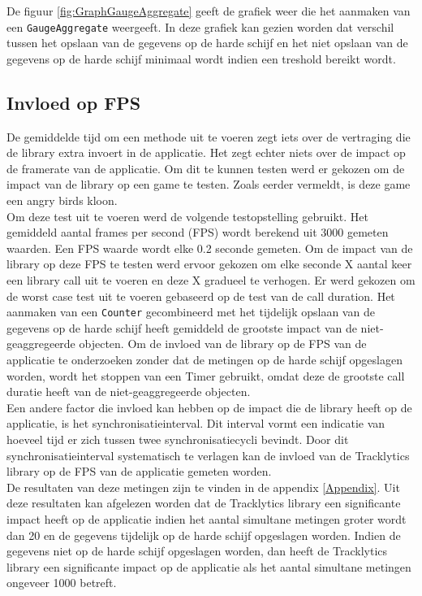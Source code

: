 De figuur \ref{fig:GraphGaugeAggregate} geeft de grafiek weer die het aanmaken van een \texttt{GaugeAggregate} weergeeft. In deze grafiek kan gezien worden dat verschil tussen het opslaan van de gegevens op de harde schijf en het niet opslaan van de gegevens op de harde schijf minimaal wordt indien een treshold bereikt wordt. \\


\subsection{Invloed op FPS}
De gemiddelde tijd om een methode uit te voeren zegt iets over de vertraging die de library extra invoert in de applicatie. Het zegt echter niets over de impact op de framerate van de applicatie. Om dit te kunnen testen werd er gekozen om de impact van de library op een game te testen. Zoals eerder vermeldt, is deze game een angry birds kloon. \\

Om deze test uit te voeren werd de volgende testopstelling gebruikt. Het gemiddeld aantal frames per second (FPS) wordt berekend uit 3000 gemeten waarden. Een FPS waarde wordt elke 0.2 seconde gemeten. Om de impact van de library op deze FPS te testen werd ervoor gekozen om elke seconde X aantal keer een library call uit te voeren en deze X gradueel te verhogen. Er werd gekozen om de worst case test uit te voeren gebaseerd op de test van de call duration. Het aanmaken van een \texttt{Counter} gecombineerd met het tijdelijk opslaan van de gegevens op de harde schijf heeft gemiddeld de grootste impact van de niet-geaggregeerde objecten. Om de invloed van de library op de FPS van de applicatie te onderzoeken zonder dat de metingen op de harde schijf opgeslagen worden, wordt het stoppen van een Timer gebruikt, omdat deze de grootste call duratie heeft van de niet-geaggregeerde objecten. \\

Een andere factor die invloed kan hebben op de impact die de library heeft op de applicatie, is het synchronisatieinterval. Dit interval vormt een indicatie van hoeveel tijd er zich tussen twee synchronisatiecycli bevindt. Door dit synchronisatieinterval systematisch te verlagen kan de invloed van de Tracklytics library op de FPS van de applicatie gemeten worden. \\


De resultaten van deze metingen zijn te vinden in de appendix \ref{Appendix}. Uit deze resultaten kan afgelezen worden dat de Tracklytics library een significante impact heeft op de applicatie indien het aantal simultane metingen groter wordt dan 20 en de gegevens tijdelijk op de harde schijf opgeslagen worden. Indien de gegevens niet op de harde schijf opgeslagen worden, dan heeft de Tracklytics library een significante impact op de applicatie als het aantal simultane metingen ongeveer 1000 betreft. \\


